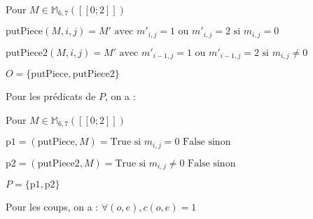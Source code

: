 \documentclass{article}
\begin{document}
Pour $M \in \mathbb{M}_{6, 7}([\![0;2]\!])$

$\text{putPiece}(M, i, j) = M'\text{ avec }m'_{i, j} = 1\text{ ou }m'_{i, j} = 2\text{ si }m_{i, j} = 0$

$\text{putPiece2}(M, i, j) = M'\text{ avec }m'_{i-1, j} = 1\text{ ou }m'_{i-1, j} = 2\text{ si }m_{i, j} \neq 0$


$O = \{ \text{putPiece}, \text{putPiece2} \}$

Pour les prédicats de $P$, on a :

Pour $M \in \mathbb{M}_{6, 7}([\![0;2]\!])$

$\text{p1} = (\text{putPiece}, M) = \text{True si }m_{i, j} = 0\text{ False sinon} $

$\text{p2} = (\text{putPiece2}, M) = \text{True si }m_{i, j} \neq 0\text{ False sinon} $


$P = \{\text{p1}, \text{p2} \}$


Pour les coups, on a : $\forall(o,e), c(o,e) = 1$
\end{document}
